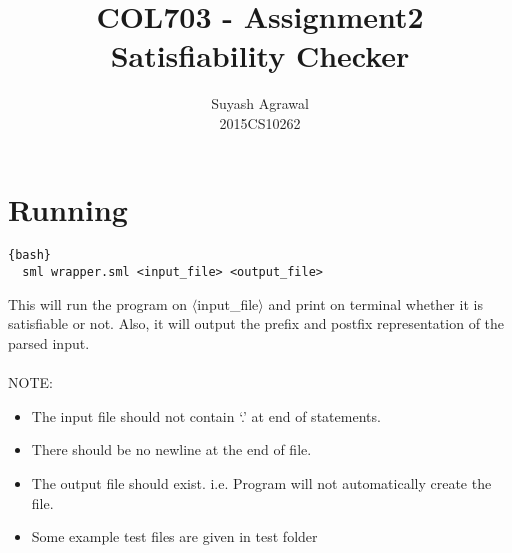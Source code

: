 \documentclass{article}
\title{COL703 - Assignment2\\Satisfiability Checker}
\author{Suyash Agrawal\\2015CS10262}
\begin{document}
\maketitle

\section{Running}
\begin{lstlisting}{bash}
  sml wrapper.sml <input_file> <output_file>
\end{lstlisting}
This will run the program on $\langle$input\_file$\rangle$ and print on terminal whether it is
satisfiable or not. Also, it will output the prefix and postfix representation
of the parsed input.\\\\
NOTE:
\begin{itemize}
\item The input file should not contain `.' at end of statements.
\item There should be no newline at the end of file.
\item The output file should exist. i.e. Program will not automatically create the file.
\item Some example test files are given in test folder
\end{itemize}
\end{document}
